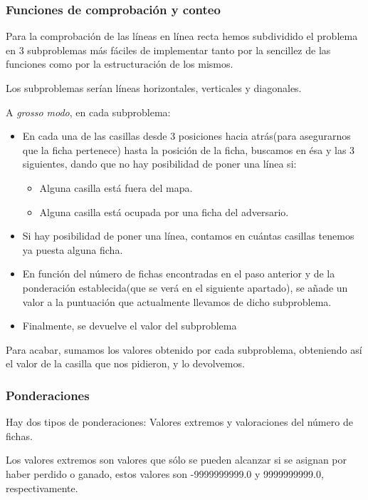 \documentclass[a4paper, 11pt]{article}
\begin{document}
		\subsubsection{Funciones de comprobación y conteo}
			Para la comprobación de las líneas en línea recta hemos subdividido el problema en 3
			subproblemas más fáciles de implementar tanto por la sencillez de las funciones como
			por la estructuración de los mismos.
			
			Los subproblemas serían líneas horizontales, verticales y diagonales.
			
			A \textit{grosso modo}, en cada subproblema:
			\begin{itemize}
				\item En cada una de las casillas desde 3 posiciones hacia atrás(para asegurarnos
				que la ficha pertenece) hasta la posición de la ficha, buscamos en ésa y las 3
				siguientes, dando que no hay posibilidad de poner una línea si:
				\begin{itemize}
					\item Alguna casilla está fuera del mapa.
					\item Alguna casilla está ocupada por una ficha del adversario.
				\end{itemize}
				
				\item Si hay posibilidad de poner una línea, contamos en cuántas casillas tenemos
				ya puesta alguna ficha.
				
				\item En función del número de fichas encontradas en el paso anterior y de la
				ponderación establecida(que se verá en el siguiente apartado), se añade un valor
				a la puntuación que actualmente llevamos de dicho subproblema.
				
				\item Finalmente, se devuelve el valor del subproblema
			\end{itemize}
			
			Para acabar, sumamos los valores obtenido por cada subproblema, obteniendo así el valor
			de la casilla que nos pidieron, y lo devolvemos.
	
		\subsubsection{Ponderaciones}
			Hay dos tipos de ponderaciones: Valores extremos y valoraciones del número de fichas.
			
			Los valores extremos son valores que sólo se pueden alcanzar si se asignan por haber
			perdido o ganado, estos valores son -9999999999.0 y 9999999999.0, respectivamente.
		
\end{document}
